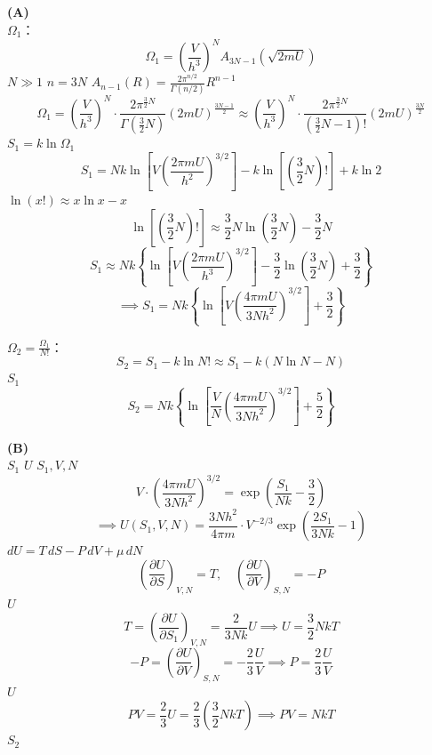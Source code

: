 \vspace{2em}
\subsection*{}

\textbf{(A) } \\
 $\Omega_1$：
\[ \Omega_{1} = \left(\frac{V}{h^{3}}\right)^{N} A_{3N-1}(\sqrt{2mU}) \]
 $N \gg 1$ $n = 3N$ $A_{n-1}(R) = \frac{2\pi^{n/2}}{\Gamma(n/2)}R^{n-1}$
\[ \Omega_{1} = \left(\frac{V}{h^{3}}\right)^{N} \cdot \frac{2\pi^{\frac{3}{2}N}}{\Gamma\left(\frac{3}{2}N\right)} (2mU)^{\frac{3N-1}{2}} \approx \left(\frac{V}{h^{3}}\right)^{N} \cdot \frac{2\pi^{\frac{3}{2}N}}{\left(\frac{3}{2}N-1\right)!} (2mU)^{\frac{3N}{2}} \]
 $S_1 = k \ln \Omega_1$ 
\[ S_{1} = Nk \ln \left[ V \left(\frac{2\pi mU}{h^{2}}\right)^{3/2} \right] - k \ln\left[\left(\frac{3}{2}N\right)!\right] + k \ln 2 \]
 $\ln(x!) \approx x \ln x - x$ 
\[ \ln\left[\left(\frac{3}{2}N\right)!\right] \approx \frac{3}{2}N \ln \left(\frac{3}{2}N\right) - \frac{3}{2}N \]
\[ S_{1} \approx Nk \left\{ \ln \left[ V \left(\frac{2\pi mU}{h^{3}}\right)^{3/2} \right] - \frac{3}{2} \ln \left(\frac{3}{2}N\right) + \frac{3}{2} \right\} \]
\[ \implies S_{1} = Nk \left\{ \ln \left[ V \left(\frac{4\pi mU}{3Nh^{2}}\right)^{3/2} \right] + \frac{3}{2} \right\} \]

 $\Omega_2 = \frac{\Omega_1}{N!}$：
\[ S_{2} = S_{1} - k \ln N! \approx S_{1} - k (N \ln N - N) \]
 $S_1$ 
\[ S_{2} = Nk \left\{ \ln \left[ \frac{V}{N} \left(\frac{4\pi mU}{3Nh^{2}}\right)^{3/2} \right] + \frac{5}{2} \right\} \]

\vspace{1em}
\textbf{(B) } \\
 $S_1$  $U$  $S_1, V, N$ 
\[ V \cdot \left(\frac{4\pi mU}{3Nh^{2}}\right)^{3/2} = \exp\left(\frac{S_{1}}{Nk} - \frac{3}{2}\right) \]
\[ \implies U(S_1, V, N) = \frac{3Nh^{2}}{4\pi m} \cdot V^{-2/3} \exp\left(\frac{2S_{1}}{3Nk} - 1\right) \]
 $dU = T\,dS - P\,dV + \mu\,dN$ 
\[ \left(\frac{\partial U}{\partial S}\right)_{V,N} = T, \quad \left(\frac{\partial U}{\partial V}\right)_{S,N} = -P \]
 $U$ 
\[ T = \left(\frac{\partial U}{\partial S_1}\right)_{V,N} = \frac{2}{3Nk} U \implies U = \frac{3}{2}NkT \]
\[ -P = \left(\frac{\partial U}{\partial V}\right)_{S,N} = -\frac{2}{3} \frac{U}{V} \implies P = \frac{2}{3} \frac{U}{V} \]
 $U$
\[ PV = \frac{2}{3}U = \frac{2}{3}\left(\frac{3}{2}NkT\right) \implies PV = NkT \]
 $S_2$ 

